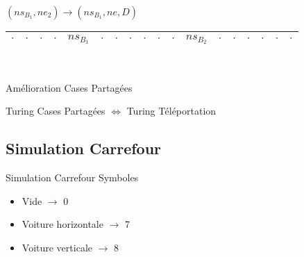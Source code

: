 \documentclass[12pt]{beamer}
\begin{document}
\begin{frame}{}
\begin{center}
\begin{tabular}{|c|c|c|c|c|c|c|c|c|c|c|c|c|c|c|c|c|c|}
\end{tabular}\\

        \pause

\vspace{0.5cm}

    $(ns_{B_1},ne_2) \longrightarrow (ns_{B_1}, ne, D)$\\
    

\begin{tabular}{|c|c|c|c|c|c|c|c|c|c|c|c|c|c|c|c|c|c|}\hline
     $\cdot$ & $\cdot$ & $\cdot$ & $\cdot$ & $ns_{B_1}$ & $\cdot$ & $\cdot$ & $\cdot$ & $\cdot$ & $\cdot$ & $\cdot$ & $ns_{B_2}$ & $\cdot$ & $\cdot$ & $\cdot$ & $\cdot$ & $\cdot$ & $\cdot$ \\\hline    
     
\end{tabular}\\

    \end{center}
\end{frame}

\begin{frame}{Amélioration Cases Partagées}
\begin{center}
    \begin{tcolorbox}[colframe=red, hbox]
    \large Turing Cases Partagées $\Longleftrightarrow$ Turing Téléportation
\end{tcolorbox}
\end{center}

\end{frame}

\subsection{Simulation Carrefour}
\begin{frame}{Simulation Carrefour}
    Symboles
    \begin{itemize}
    \vspace{1cm}
        \item Vide $\longrightarrow$ 0 \\
        \vspace{1cm}
        \item Voiture horizontale $\longrightarrow$ 7 \\
        \vspace{1cm}
        \item Voiture verticale $\longrightarrow$ 8 \\
    \end{itemize}
\end{frame}
\end{document}

